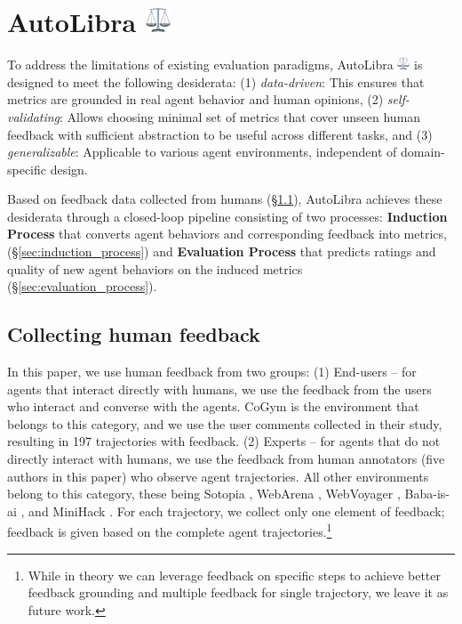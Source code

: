\section{\texorpdfstring{AutoLibra \includegraphics[height=1em]{figs/scale.png}}{AutoLibra}}

To address the limitations of existing evaluation paradigms, AutoLibra \protect\includegraphics[height=1em]{figs/scale.png} is designed to
meet the following desiderata: (1) \emph{data-driven}: This ensures that metrics are grounded
in real agent behavior and human opinions,  (2) \emph{self-validating}: Allows choosing minimal set of metrics that cover unseen human feedback with sufficient abstraction to be useful across different tasks, and (3) \emph{generalizable}: Applicable to various agent environments, independent of domain-specific design.

Based on feedback data collected from humans (\S\ref{sec:collecting-human-feedback}), AutoLibra achieves these desiderata through a closed-loop pipeline
consisting of two processes: \textbf{Induction Process} that converts agent behaviors and corresponding feedback into metrics, (\S\ref{sec:induction_process}) and \textbf{Evaluation Process} that predicts ratings and quality of new agent behaviors on the induced metrics (\S\ref{sec:evaluation_process}). 


\subsection{Collecting human feedback}
\label{sec:collecting-human-feedback}
In this paper, we use human feedback from two groups: (1) End-users -- for agents that interact directly with humans, we use the feedback from the users who interact and converse with the agents. CoGym \citep{shao2024collaborative}
is the environment that belongs to this category, and we use the user comments collected in their study, resulting
in 197 trajectories with feedback. (2) Experts -- for agents that
do not directly interact with humans, we use the feedback from human annotators (five authors in this paper) who observe agent trajectories. All other environments belong to this category, these being Sotopia \citep{zhousotopia}, WebArena \citep{zhouwebarena}, WebVoyager \citep{he2024webvoyager}, Baba-is-ai \citep{cloos2024babaaibreakrules}, and MiniHack \citep{samvelyan2021minihackplanetsandboxopenended}. For each trajectory, we collect only one element of feedback; feedback is given based on the complete agent trajectories.\footnote{While in theory we can leverage feedback on specific steps to achieve better feedback grounding and multiple feedback for single trajectory, we leave it as future work.}

